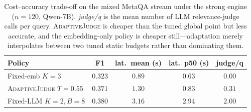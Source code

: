 \begin{table}[tb]
\centering
\caption{Cost--accuracy trade-off on the mixed MetaQA stream under the strong engine ($n{=}120$, Qwen-7B). \emph{judge/q} is the mean number of LLM relevance-judge calls per query. \textsc{AdaptiveJudge} is cheaper than the tuned global point but less accurate, and the embedding-only policy is cheaper still---adaptation merely interpolates between two tuned static budgets rather than dominating them.}
\label{tab:cost}
\small
\begin{tabular}{lcccc}
\toprule
Policy & F1 & lat.\ mean (s) & lat.\ p50 (s) & judge/q \\
\midrule
Fixed-emb $K{=}3$        & $0.323$ & $0.89$ & $0.63$ & $0.00$ \\
\textsc{AdaptiveJudge} $T{=}0.55$ & $0.371$ & $1.30$ & $0.83$ & $0.31$ \\
Fixed-LLM $K{=}2,B{=}8$  & $\mathbf{0.380}$ & $3.16$ & $2.94$ & $2.00$ \\
\bottomrule
\end{tabular}
\end{table}
